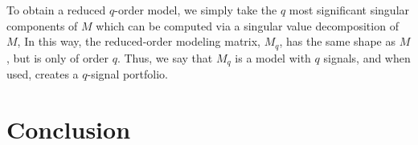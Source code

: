 \documentclass{article}
\begin{document}
    To obtain a reduced $q$-order model, 
        we simply take the $q$ most significant singular components of $M$
        which can be computed via a singular value decomposition of $M$,
    In this way, the reduced-order modeling matrix, $M_q$,
        has the same shape as $M$, but is only of order $q$.
    Thus, we say that $M_q$ is a model with $q$ signals,
        and when used, creates a $q$-signal portfolio.

\section{Conclusion}
    
\end{document}
